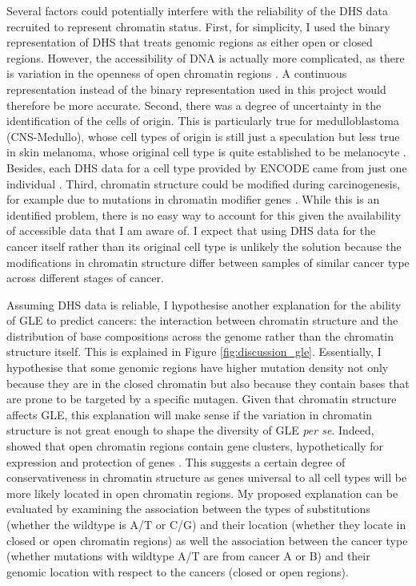 Several factors could potentially interfere with the reliability of the DHS data recruited to represent chromatin status. First, for simplicity, I used the binary representation of DHS that treats genomic regions as either open or closed regions. However, the accessibility of DNA is actually more complicated, as there is variation in the openness of open chromatin regions \citep{Boyle2008High-ResolutionGenome}. A continuous representation instead of the binary representation used in this project would therefore be more accurate. Second, there was a degree of uncertainty in the identification of the cells of origin. This is particularly true for medulloblastoma (CNS-Medullo), whose cell types of origin is still just a speculation \citep{Penas2015TheMedulloblastoma} but less true in skin melanoma, whose original cell type is quite established to be melanocyte \citep{Lin2007MelanocytePigmentation}. Besides, each DHS data for a cell type provided by ENCODE came from just one individual \citep{Thurman2012TheGenome}. Third, chromatin structure could be modified during carcinogenesis, for example due to mutations in chromatin modifier genes \citep{Makova2015TheGenome}. While this is an identified problem, there is no easy way to account for this given the availability of accessible data that I am aware of. I expect that using DHS data for the cancer itself rather than its original cell type is unlikely the solution because the modifications in chromatin structure differ between samples of similar cancer type across different stages of cancer.

Assuming DHS data is reliable, I hypothesise another explanation for the ability of GLE to predict cancers: the interaction between chromatin structure and the distribution of base compositions across the genome rather than the chromatin structure itself. This is explained in Figure \ref{fig:discussion_gle}. Essentially, I hypothesise that some genomic regions have higher mutation density not only because they are in the closed chromatin but also because they contain bases that are prone to be targeted by a specific mutagen. Given that chromatin structure affects GLE, this explanation will make sense if the variation in chromatin structure is not great enough to shape the diversity of GLE \textit{per se}. Indeed, \citet{Gilbert2004ChromatinFibers} showed that open chromatin regions contain gene clusters, hypothetically for expression and protection of genes \citep{Gilbert2004ChromatinFibers,Gazave2005DoesDamage}. This suggests a certain degree of conservativeness in chromatin structure as genes universal to all cell types will be more likely located in open chromatin regions. My proposed explanation can be evaluated by examining the association between the types of substitutions (whether the wildtype is A/T or C/G) and their location (whether they locate in closed or open chromatin regions) as well the association between the cancer type (whether mutations with wildtype A/T are from cancer A or B) and their genomic location with respect to the cancers (closed or open regions). 

